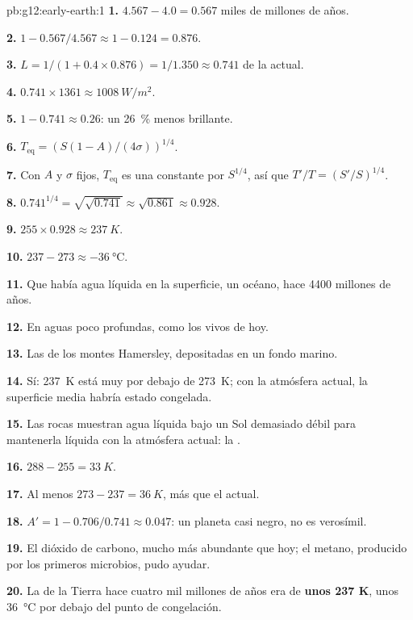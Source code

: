 \begin{solution}{pb:g12:early-earth:1}
\textbf{1.} $4.567 - 4.0 = 0.567$ miles de millones de años.

\textbf{2.} $1 - 0.567/4.567 \approx 1 - 0.124 = 0.876$.

\textbf{3.} $L = 1/(1 + 0.4 \times 0.876) = 1/1.350 \approx 0.741$ de la
actual.

\textbf{4.} $0.741 \times 1361 \approx \qty{1008}{W/m^2}$.

\textbf{5.} $1 - 0.741 \approx 0.26$: un \qty{26}{\percent} menos brillante.

\textbf{6.} $T_{\mathrm{eq}} = \left(S(1-A)/(4\sigma)\right)^{1/4}$.

\textbf{7.} Con $A$ y $\sigma$ fijos, $T_{\mathrm{eq}}$ es una constante por
$S^{1/4}$, así que $T'/T = (S'/S)^{1/4}$.

\textbf{8.} $0.741^{1/4} = \sqrt{\sqrt{0.741}} \approx \sqrt{0.861} \approx
0.928$.

\textbf{9.} $255 \times 0.928 \approx \qty{237}{K}$.

\textbf{10.} $237 - 273 \approx \qty{-36}{\celsius}$.

\textbf{11.} Que había agua líquida en la superficie, un océano, hace 4400
millones de años.

\textbf{12.} En aguas poco profundas, como los  vivos de hoy.

\textbf{13.} Las  de los montes Hamersley,
depositadas en un fondo marino.

\textbf{14.} Sí: \qty{237}{K} está muy por debajo de \qty{273}{K}; con la
atmósfera actual, la superficie media habría estado congelada.

\textbf{15.} Las rocas muestran agua líquida bajo un Sol demasiado débil para
mantenerla líquida con la atmósfera actual: la .

\textbf{16.} $288 - 255 = \qty{33}{K}$.

\textbf{17.} Al menos $273 - 237 = \qty{36}{K}$, más que el actual.

\textbf{18.} $A' = 1 - 0.706/0.741 \approx 0.047$: un planeta casi negro, no
es verosímil.

\textbf{19.} El dióxido de carbono, mucho más abundante que hoy; el metano,
producido por los primeros microbios, pudo ayudar.

\textbf{20.} La  de la Tierra hace cuatro mil
millones de años era de \textbf{unos 237 K}, unos \qty{36}{\celsius} por
debajo del punto de congelación.
\end{solution}
